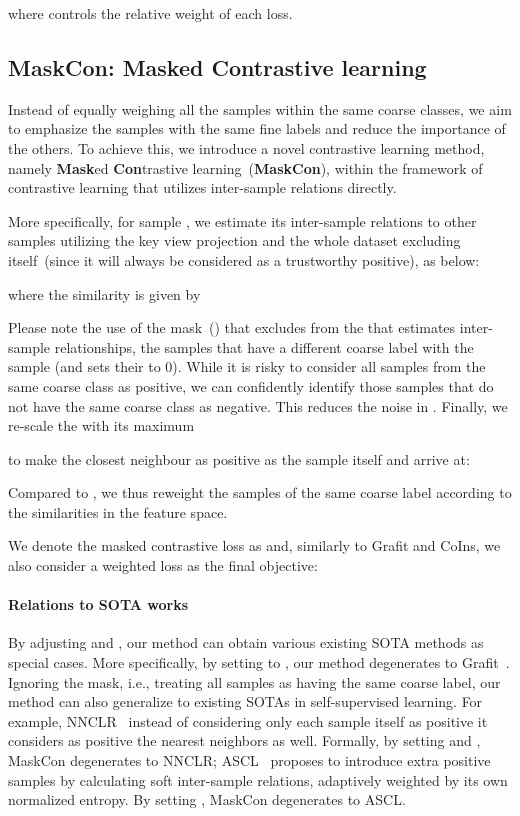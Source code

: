 \documentclass[10pt,twocolumn,letterpaper]{article}
\begin{document}
where  controls the relative weight of each loss.

\subsection{MaskCon: Masked Contrastive learning}\label{method_maskcon}
Instead of equally weighing all the samples within the same coarse classes, we aim to emphasize the samples with the same fine labels and reduce the importance of the others. To achieve this, we introduce a novel contrastive learning method, namely \textbf{Mask}ed \textbf{Con}trastive learning~(\textbf{MaskCon}), within the framework of contrastive learning that utilizes inter-sample relations directly.


More specifically, for sample , we estimate its inter-sample relations  to other samples utilizing the key view projection  and the whole dataset  excluding itself~(since it will always be considered as a trustworthy positive), as below:

where the similarity  is given by

Please note the use of the mask~() that excludes from the  that estimates inter-sample relationships, the samples  that have a different coarse label with the sample  (and sets their  to 0). While it is risky to consider all samples from the same coarse class as positive, we can confidently identify those samples that do not have the same coarse class as negative. This reduces the noise in .
Finally, we re-scale the  with its maximum

to make the closest neighbour as positive as the sample itself and arrive at:

Compared to , we thus reweight the samples of the same coarse label according to the similarities in the feature space.

We denote the masked contrastive loss as  and, similarly to Grafit and CoIns, we also consider a weighted loss as the final objective:



\paragraph{Relations to SOTA works}\label{method:relation_to_otherworks}
By adjusting  and , our method can obtain various existing SOTA methods as special cases. More specifically, by setting  to , our method degenerates to Grafit~\cite{touvron2021grafit}. Ignoring the mask, i.e., treating all samples as having the same coarse label,
our method can also generalize to existing SOTAs in self-supervised learning. For example, NNCLR~\cite{dwibedi2021nnclr} instead of considering only each sample itself as positive it considers as positive the nearest neighbors as well. Formally, by setting  and , MaskCon degenerates to NNCLR; ASCL~\cite{ascl} proposes to introduce extra positive samples by calculating soft inter-sample relations, adaptively weighted by its own normalized entropy. By setting , MaskCon degenerates to ASCL. 
\end{document}
